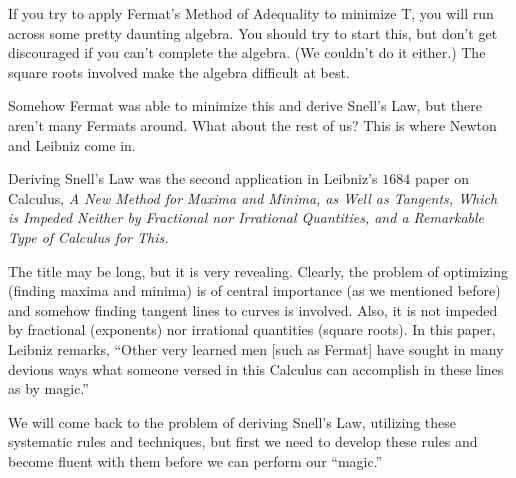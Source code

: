 If you try to apply Fermat's Method of Adequality to minimize T, you
will run across some pretty daunting algebra.  You should try to start
this, but don't get discouraged if you can't complete the algebra. (We
couldn't do it either.)  The square roots involved make the algebra
difficult at best.

Somehow Fermat was able to minimize this and derive Snell's Law, but
there aren't many Fermats around.  What about the rest of us?  This is
where Newton and Leibniz come in.

Deriving Snell's Law was the second application in Leibniz's $1684$ paper
on Calculus, \emph{A New Method for Maxima and Minima, as Well as Tangents,
Which is Impeded Neither by Fractional nor Irrational Quantities, and
a Remarkable Type of Calculus for This.}

The title may be long, but it is very revealing.  Clearly, the problem
of optimizing (finding maxima and minima) is of central importance (as
we mentioned before) and somehow finding tangent lines to curves is
involved.  Also, it is not impeded by fractional (exponents) nor
irrational quantities (square roots).  In this paper, Leibniz remarks,
``Other very learned men [such as Fermat] have sought in many devious
ways what someone versed in this Calculus can accomplish in these
lines as by magic.''

We will come back to the problem of deriving Snell's Law, utilizing
these systematic rules and techniques, but first we need to develop
these rules and become fluent with them before we can perform our
``magic.''

